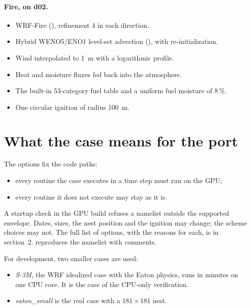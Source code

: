 \paragraph{Fire, on d02.}
\begin{itemize}
  \item WRF-Fire (), refinement 4 in each direction.
  \item Hybrid WENO5/ENO1 level-set advection (), with re-initialization.
  \item Wind interpolated to 1~m with a logarithmic profile.
  \item Heat and moisture fluxes fed back into the atmosphere.
  \item The built-in 53-category fuel table and a uniform fuel moisture of 8\,\%.
  \item One circular ignition of radius 100~m.
\end{itemize}

\section{What the case means for the port}

The options fix the code paths:
\begin{itemize}
  \item every routine the case executes in a time step must run on the GPU;
  \item every routine it does not execute may stay as it is.
\end{itemize}

A startup check in the GPU build refuses a namelist outside the supported envelope. Dates, sizes, the nest position
and the ignition may change; the scheme choices may not. The full list of options, with the reasons for each, is in
 section~2.  reproduces the namelist with comments.

\begin{portnote}
For development, two smaller cases are used:
\begin{itemize}
  \item \emph{S-3M}, the WRF  idealized case with the Eaton physics, runs in minutes on one CPU core.
    It is the case of the CPU-only verification.
  \item \emph{eaton\_small} is the real case with a $181\times181$ nest.
\end{itemize}
\end{portnote}
